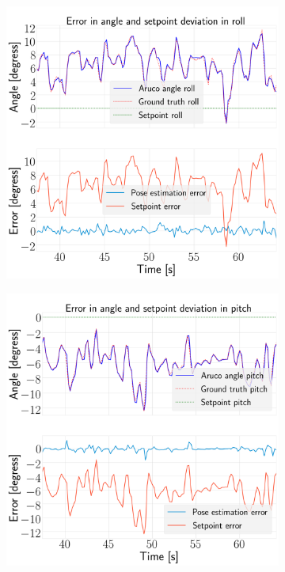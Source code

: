 \documentclass[../Head/report.tex]{subfiles}
\begin{document}
\begin{figure}[H]
    \centering
    \begin{subfigure}[t]{.30\textwidth}
        \centering
        \includegraphics[width=\textwidth]{../Figures/hold_pose_using_aruco_pose_estimation/pose_error_roll_test2.png}
        \caption{}
        \label{fig:hold_pose_estimation_test2_roll}
    \end{subfigure}
     \hspace{0.2em}
    \begin{subfigure}[t]{.30\textwidth}
        \centering
        \includegraphics[width=\textwidth]{../Figures//hold_pose_using_aruco_pose_estimation/pose_error_pitch_test2.png}

\end{subfigure}
\end{figure}
\end{document}
